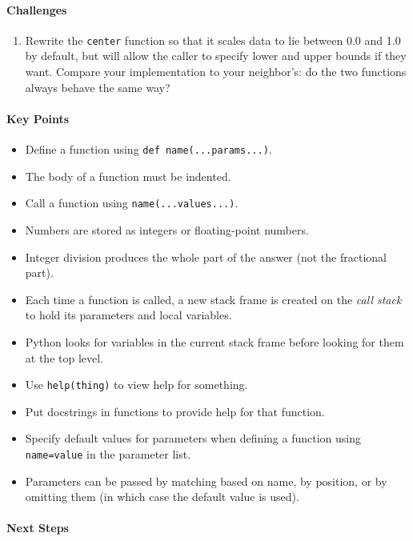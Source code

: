 \documentclass[]{book}
\newcommand{\gdef}[2]{\emph{#2}}
\begin{document}
\mbox{}\paragraph{Challenges}

\begin{enumerate}
\item
  Rewrite the \texttt{center} function so that it scales data to lie
  between 0.0 and 1.0 by default, but will allow the caller to specify
  lower and upper bounds if they want. Compare your implementation to
  your neighbor's: do the two functions always behave the same way?
\end{enumerate}

\mbox{}\paragraph{Key Points}

\begin{itemize}
\item
  Define a function using \texttt{def name(...params...)}.
\item
  The body of a function must be indented.
\item
  Call a function using \texttt{name(...values...)}.
\item
  Numbers are stored as integers or floating-point numbers.
\item
  Integer division produces the whole part of the answer (not the
  fractional part).
\item
  Each time a function is called, a new stack frame is created on the
  \gdef{g:call-stack}{call stack} to hold its parameters and local
  variables.
\item
  Python looks for variables in the current stack frame before looking
  for them at the top level.
\item
  Use \texttt{help(thing)} to view help for something.
\item
  Put docstrings in functions to provide help for that function.
\item
  Specify default values for parameters when defining a function using
  \texttt{name=value} in the parameter list.
\item
  Parameters can be passed by matching based on name, by position, or by
  omitting them (in which case the default value is used).
\end{itemize}

\mbox{}\paragraph{Next Steps}
\end{document}
